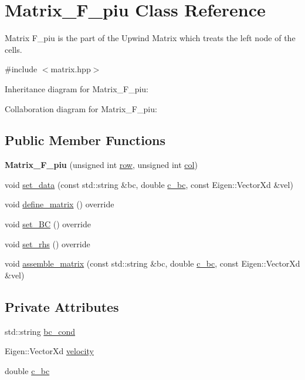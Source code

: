\hypertarget{classMatrix__F__piu}{}\section{Matrix\+\_\+\+F\+\_\+piu Class Reference}
\label{classMatrix__F__piu}


Matrix F\+\_\+piu is the part of the Upwind Matrix which treats the left node of the cells.  




{\ttfamily \#include $<$matrix.\+hpp$>$}



Inheritance diagram for Matrix\+\_\+\+F\+\_\+piu\+:


Collaboration diagram for Matrix\+\_\+\+F\+\_\+piu\+:
\subsection*{Public Member Functions}
\begin{DoxyCompactItemize}
\item 
\mbox{\label{classMatrix__F__piu_a14c048fcc94a2b153d19f2ac017b7d08}} 
{\bfseries Matrix\+\_\+\+F\+\_\+piu} (unsigned int \hyperlink{classAbstractMatrix_a27fb46bf2853d4927d92a81b8b7773fb}{row}, unsigned int \hyperlink{classAbstractMatrix_af3ad3551ce094979488cef5df0e4fc1d}{col})
\item 
void \hyperlink{classMatrix__F__piu_a4b631309cacec285bddcb02f5058459a}{set\+\_\+data} (const std\+::string \&bc, double \hyperlink{classMatrix__F__piu_ae3b52ffd1775204d798f71cb2a764418}{c\+\_\+bc}, const Eigen\+::\+Vector\+Xd \&vel)
\item 
void \hyperlink{classMatrix__F__piu_a137056684d91ecfac671f22518780d47}{define\+\_\+matrix} () override
\item 
void \hyperlink{classMatrix__F__piu_afa51e1c04b403a491178bbeda322ce9d}{set\+\_\+\+BC} () override
\item 
void \hyperlink{classMatrix__F__piu_a174bfb860e79ad913fef24202d3ce96d}{set\+\_\+rhs} () override
\item 
void \hyperlink{classMatrix__F__piu_a1c640185a5b427345d92e76c82b78f70}{assemble\+\_\+matrix} (const std\+::string \&bc, double \hyperlink{classMatrix__F__piu_ae3b52ffd1775204d798f71cb2a764418}{c\+\_\+bc}, const Eigen\+::\+Vector\+Xd \&vel)
\end{DoxyCompactItemize}
\subsection*{Private Attributes}
\begin{DoxyCompactItemize}
\item 
std\+::string \hyperlink{classMatrix__F__piu_a21cf5eed26e8fb9e8ad570bc56b1ea68}{bc\+\_\+cond}
\item 
Eigen\+::\+Vector\+Xd \hyperlink{classMatrix__F__piu_add146b5bb9b16e37ca9fbd3727c5ebe3}{velocity}
\item 
double \hyperlink{classMatrix__F__piu_ae3b52ffd1775204d798f71cb2a764418}{c\+\_\+bc}
\end{DoxyCompactItemize}
